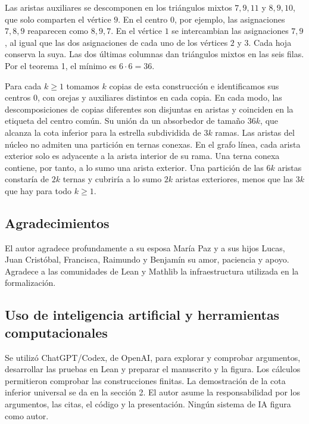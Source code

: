 \documentclass[spanish,11pt,a4paper]{article}
\begin{document}
Las aristas auxiliares se descomponen en los triángulos mixtos \(7,9,11\) y \(8,9,10\), que solo comparten el vértice \(9\). En el centro \(0\), por ejemplo, las asignaciones \(7,8,9\) reaparecen como \(8,9,7\). En el vértice \(1\) se intercambian las asignaciones \(7,9\), al igual que las dos asignaciones de cada uno de los vértices \(2\) y \(3\). Cada hoja conserva la suya. Las dos últimas columnas dan triángulos mixtos en las seis filas. Por el teorema 1, el mínimo es \(6\cdot6=36\).

Para cada \(k\ge1\) tomamos \(k\) copias de esta construcción e identificamos sus centros \(0\), con orejas y auxiliares distintos en cada copia. En cada modo, las descomposiciones de copias diferentes son disjuntas en aristas y coinciden en la etiqueta del centro común. Su unión da un absorbedor de tamaño \(36k\), que alcanza la cota inferior para la estrella subdividida de \(3k\) ramas. Las aristas del núcleo no admiten una partición en ternas conexas. En el grafo línea, cada arista exterior solo es adyacente a la arista interior de su rama. Una terna conexa contiene, por tanto, a lo sumo una arista exterior. Una partición de las \(6k\) aristas constaría de \(2k\) ternas y cubriría a lo sumo \(2k\) aristas exteriores, menos que las \(3k\) que hay para todo \(k\ge1\).

\subsection{Agradecimientos}\label{agradecimientos}

El autor agradece profundamente a su esposa María Paz y a sus hijos Lucas, Juan Cristóbal, Francisca, Raimundo y Benjamín su amor, paciencia y apoyo. Agradece a las comunidades de Lean y Mathlib la infraestructura utilizada en la formalización.

\subsection{Uso de inteligencia artificial y herramientas computacionales}\label{uso-de-inteligencia-artificial-y-herramientas-computacionales}

Se utilizó ChatGPT/Codex, de OpenAI, para explorar y comprobar argumentos, desarrollar las pruebas en Lean y preparar el manuscrito y la figura. Los cálculos permitieron comprobar las construcciones finitas. La demostración de la cota inferior universal se da en la sección 2. El autor asume la responsabilidad por los argumentos, las citas, el código y la presentación. Ningún sistema de IA figura como autor.
\end{document}
